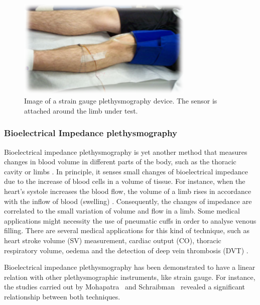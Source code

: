 \begin{figure}[!htpb]
	\centering
	\includegraphics[width=0.75\textwidth,keepaspectratio,trim={0.5cm 0.5cm 0.5cm 0.5cm}, clip]{figure6}    
	\caption[Strain gauge plethysmography]{Image of a strain gauge plethysmography device. The sensor is attached around the limb under test.}
	\label{fig:strain gauge}
\end{figure}

\subsubsection{Bioelectrical Impedance plethysmography}
\label{section literature BI}
Bioelectrical impedance plethysmography is yet another method that measures changes in blood volume in different parts of the body, such as the thoracic cavity or limbs \cite{bera2014bioelectrical}. In principle, it senses small changes of bioelectrical impedance due to the increase of blood cells in a volume of tissue. For instance, when the heart's systole increases the blood flow, the volume of a limb rises in accordance with the inflow of blood (swelling) \cite{martinsen2011bioimpedance}. Consequently, the changes of impedance are correlated to the small variation of volume and flow in a limb. Some medical applications might necessity the use of pneumatic cuffs in order to analyse venous filling. There are several medical applications for this kind of technique, such as heart stroke volume (SV) measurement, cardiac output (CO), thoracic respiratory volume, oedema and the detection of deep vein thrombosis (DVT) \cite{holohan1996plethysmography}. 

Bioelectrical impedance plethysmography has been demonstrated to have a linear relation with other plethysmographic instruments, like strain gauge. For instance, the studies carried out by Mohapatra~\cite{mohapatra1979measurement} and Schraibman~\cite{schraibman1975comparison} revealed a significant relationship between both techniques.


